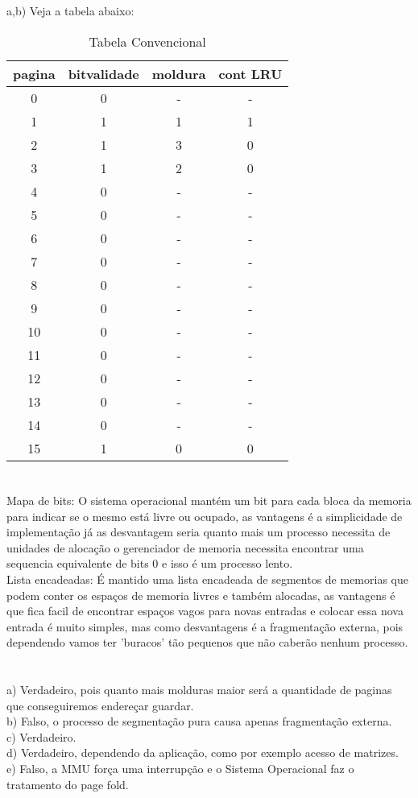 \documentclass[12pt]{article}
\begin{document}
\newpage
\section{} %
a,b) Veja a tabela abaixo:

\begin{table}[ht]
\centering
\caption{Tabela Convencional}
\vspace{0.9cm}
\begin{tabular}{c|c|c|c}
\hline   
\hline   
pagina & bitvalidade & moldura & cont LRU \\
\hline   
0 & 0 & - & - \\
1 & 1 & 1 & 1\\
2 & 1 & 3 & 0\\
3 & 1 & 2 & 0\\
4 & 0 & - & -\\
5 & 0 & - & -\\
6 & 0 & - & -\\
7 & 0 & - & -\\
8 & 0 & - & -\\
9 & 0 & - & -\\
10 & 0 & - & -\\
11 & 0 & - & -\\
12 & 0 & - & -\\
13 & 0 & - & -\\
14 & 0 & - & -\\
15 & 1 & 0 & 0 \\
\hline 
\hline 
\end{tabular}

\end{table}


\section{} %
Mapa de bits: O sistema operacional mantém um bit para cada bloca da memoria para indicar se o mesmo está livre ou ocupado, as vantagens é a simplicidade de implementação já as desvantagem seria quanto mais um processo necessita de unidades de alocação o gerenciador de memoria necessita encontrar uma sequencia equivalente de bits 0 e isso é um processo lento.\\
Lista encadeadas: É mantido uma lista encadeada de segmentos de memorias que podem conter os espaços de memoria livres e também alocadas, as vantagens é que fica facil de encontrar espaços vagos para novas entradas e colocar essa nova entrada é muito simples, mas como desvantagens é a fragmentação externa, pois dependendo vamos ter 'buracos' tão pequenos que não caberão nenhum processo.
\section{} %
a) Verdadeiro, pois quanto mais molduras maior será a quantidade de paginas que conseguiremos endereçar guardar.
\\
b) Falso, o processo de segmentação pura causa apenas fragmentação externa.
\\
c) Verdadeiro.
\\
d) Verdadeiro, dependendo da aplicação, como por exemplo acesso de matrizes.
\\
e) Falso, a MMU força uma interrupção e o Sistema Operacional faz o tratamento do page fold.
\end{document}
